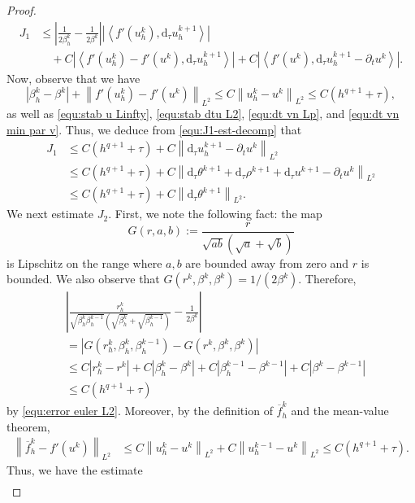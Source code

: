 \documentclass[11pt, reqno]{amsart}
\theoremstyle{definition}
\numberwithin{equation}{section}
\newcommand{\dtt}{\mathrm{d}_\tau}
\newcommand{\norm}[2]{\left\|{#1}\right\|_{#2}}
\newcommand{\inpro}[2]{\left\langle#1,#2\right\rangle}
\newcommand{\abs}[1]{\left|{#1}\right|}
\begin{document}
\begin{proof}
	\begin{align}
		J_1
		&\leq
		\abs{
			\frac{1}{2\beta_h^k}
			-
			\frac{1}{2\beta^k}
		}
		\abs{\inpro{f'(u_h^k)}{\dtt u_h^{k+1}}}
		\nonumber\\
		&\quad
		+
		C\abs{
			\inpro{f'(u_h^k)-f'(u^k)}{\dtt u_h^{k+1}}
		}
		+
		C\abs{
			\inpro{f'(u^k)}{\dtt u_h^{k+1}-\partial_t u^k}
		}.
		\label{equ:J1-est-decomp}
	\end{align}
	Now, observe that we have
	\[
	\abs{\beta_h^k-\beta^k} + \norm{f'(u_h^k)-f'(u^k)}{L^2}
	\leq
	C\norm{u_h^k-u^k}{L^2}
	\leq
	C(h^{q+1}+\tau),
	\]
	as well as \eqref{equ:stab u Linfty}, \eqref{equ:stab dtu L2}, \eqref{equ:dt vn Lp}, and \eqref{equ:dt vn min par v}. Thus, we deduce from \eqref{equ:J1-est-decomp} that
	\begin{align}
		J_1
		&\leq
		C(h^{q+1}+\tau)
		+
		C\norm{\dtt u_h^{k+1}-\partial_t u^k}{L^2}
		\nonumber\\
		&\leq
		C(h^{q+1}+\tau)
		+
		C\norm{\dtt\theta^{k+1}+
			\dtt\rho^{k+1}
			+
			\dtt u^{k+1}-\partial_t u^k}{L^2}
		\nonumber\\
		&\leq
		C(h^{q+1}+\tau)
		+
		C\norm{\dtt\theta^{k+1}}{L^2}.
		\label{equ:J1-est}
	\end{align}
	We next estimate $J_2$. First, we note the following fact: the map
	\[
	G(r,a,b):=\frac{r}{\sqrt{ab}(\sqrt a+\sqrt b)}
	\]
	is Lipschitz on the range where $a,b$ are bounded away from zero and $r$ is bounded. We also observe that
	$G(r^k,\beta^k,\beta^k)=1/(2\beta^k)$. Therefore,
	\begin{align}
		&\abs{
			\frac{r_h^k}{\sqrt{\beta_h^k\beta_h^{k-1}}
				(\sqrt{\beta_h^k}+\sqrt{\beta_h^{k-1}})}
			-
			\frac{1}{2\beta^k}
		}
		\nonumber\\
		&=
		\abs{G(r_h^k,\beta_h^k,\beta_h^{k-1})- G(r^k,\beta^k,\beta^k)}
		\nonumber\\
		&
		\leq
		C\abs{r_h^k-r^k}
		+
		C\abs{\beta_h^k-\beta^k}
		+
		C\abs{\beta_h^{k-1}-\beta^{k-1}}
		+
		C\abs{\beta^k-\beta^{k-1}}
		\nonumber\\
		&
		\leq
		C(h^{q+1}+\tau)
		\label{equ:coef-J2}
	\end{align}
	by \eqref{equ:error euler L2}.
	Moreover, by the definition of $\overline f_h^k$ and the mean-value theorem,
	\begin{align}
		\norm{\overline f_h^k-f'(u^k)}{L^2}
		&\leq
		C\norm{u_h^k-u^k}{L^2}
		+
		C\norm{u_h^{k-1}-u^k}{L^2}
		\leq
		C(h^{q+1}+\tau).
		\label{equ:fbar-est}
	\end{align}
	Thus, we have the estimate
	\begin{align}

\end{align}
\end{proof}
\end{document}
